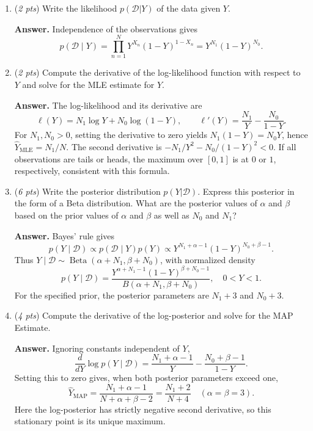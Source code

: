 \documentclass[11pt]{article}
\begin{document}
\begin{enumerate}[label=(\alph*)]
    \item (\textit{2 pts}) Write the likelihood $p(\mathcal{D} | Y)$ of the data given $Y$.

    \textbf{Answer.} Independence of the observations gives
    \[
        p(\mathcal D\mid Y)=\prod_{n=1}^N Y^{X_n}(1-Y)^{1-X_n}
        =\boxed{Y^{N_1}(1-Y)^{N_0}.}
    \]
 
    \item (\textit{2 pts}) Compute the derivative of the log-likelihood function with respect to $Y$ and solve for the MLE estimate for $Y$.

    \textbf{Answer.} The log-likelihood and its derivative are
    \[
        \ell(Y)=N_1\log Y+N_0\log(1-Y),\qquad
        \ell'(Y)=\frac{N_1}{Y}-\frac{N_0}{1-Y}.
    \]
    For $N_1,N_0>0$, setting the derivative to zero yields
    $N_1(1-Y)=N_0Y$, hence $\boxed{\hat Y_{\mathrm{MLE}}=N_1/N}$.
    The second derivative is $-N_1/Y^2-N_0/(1-Y)^2<0$.
    If all observations are tails or heads, the maximum over $[0,1]$
    is at $0$ or $1$, respectively, consistent with this formula.
   
    
    \item (\textit{6 pts}) Write the posterior distribution $p(Y|\mathcal{D})$.  Express this posterior in the form of a Beta distribution. What are the posterior values of $\alpha$ and $\beta$ based on the prior values of $\alpha$ and $\beta$ as well as $N_0$ and $N_1$?

    \textbf{Answer.} Bayes' rule gives
    \[
        p(Y\mid\mathcal D)\propto p(\mathcal D\mid Y)p(Y)
        \propto Y^{N_1+\alpha-1}(1-Y)^{N_0+\beta-1}.
    \]
    Thus $\boxed{Y\mid\mathcal D\sim\operatorname{Beta}(\alpha+N_1,\beta+N_0)}$,
    with normalized density
    \[
        p(Y\mid\mathcal D)=
        \frac{Y^{\alpha+N_1-1}(1-Y)^{\beta+N_0-1}}
             {B(\alpha+N_1,\beta+N_0)},\quad 0<Y<1.
    \]
    For the specified prior, the posterior parameters are $N_1+3$ and $N_0+3$.
    
    \item (\textit{4 pts}) Compute the derivative of the log-posterior and solve for the MAP Estimate.

    \textbf{Answer.} Ignoring constants independent of $Y$,
    \[
        \frac{d}{dY}\log p(Y\mid\mathcal D)
        =\frac{N_1+\alpha-1}{Y}-\frac{N_0+\beta-1}{1-Y}.
    \]
    Setting this to zero gives, when both posterior parameters exceed one,
    \[
        \hat Y_{\mathrm{MAP}}=\frac{N_1+\alpha-1}{N+\alpha+\beta-2}
        =\boxed{\frac{N_1+2}{N+4}}\quad(\alpha=\beta=3).
    \]
    Here the log-posterior has strictly negative second derivative,
    so this stationary point is its unique maximum.


\end{enumerate}
\end{document}

